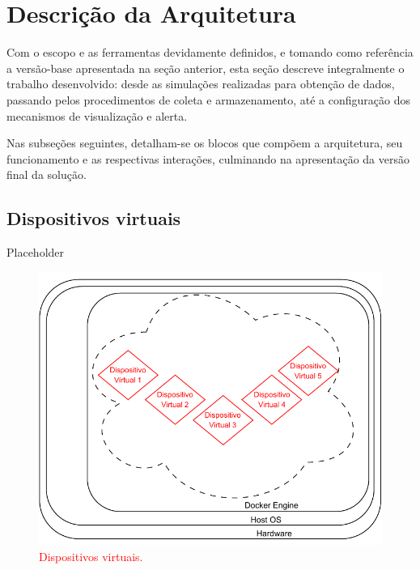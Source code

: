 \section{Descrição da Arquitetura}

{\color{red}

Com o escopo e as ferramentas devidamente definidos, e tomando como referência a versão-base apresentada na seção anterior, esta seção descreve integralmente o trabalho desenvolvido: desde as simulações realizadas para obtenção de dados, passando pelos procedimentos de coleta e armazenamento, até a configuração dos mecanismos de visualização e alerta.

Nas subseções seguintes, detalham-se os blocos que compõem a arquitetura, seu funcionamento e as respectivas interações, culminando na apresentação da versão final da solução.


\subsection{Dispositivos virtuais}
\label{subsection:DispositivosVirtuais}

Placeholder

\begin{figure}[H]
\centering
\includegraphics[scale=1]{Imagens/chap03/by-blocks/virtual_devices_diagram.pdf}
\caption{\textcolor{red}{Dispositivos virtuais.}}
\label{fig:DiagramaDispositivosVirtuais}
\end{figure}


}
